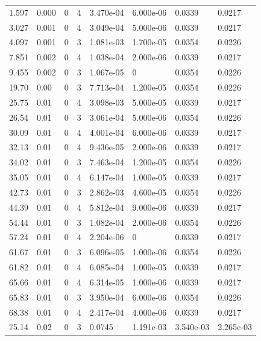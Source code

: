 \documentclass[preview]{standalone}
\begin{document}
{{\begin{tabular}{L{1.2cm}C{1.2cm} C{0.3cm}C{0.5cm} C{1.4cm}C{1.4cm} C{1.4cm}C{1.4cm}}
  1.597  &  0.000  & 0     &  4 &  3.470e-04  & 6.000e-06  & 0.0339 &  0.0217   \\ 
  3.027  &  0.001  & 0     &  4 &  3.049e-04  & 5.000e-06  & 0.0339 &  0.0217   \\ 
  4.097  &  0.001  & 0     &  3 &  1.081e-03  & 1.700e-05  & 0.0354 &  0.0226   \\ 
  7.851  &  0.002  & 0     &  4 &  1.038e-04  & 2.000e-06  & 0.0339 &  0.0217   \\ 
  9.455  &  0.002  & 0     &  3 &  1.067e-05  & 0  & 0.0354 &  0.0226   \\ 
  19.70  &  0.00  & 0     &  3 &  7.713e-04  & 1.200e-05  & 0.0354 &  0.0226   \\ 
  25.75  &  0.01  & 0     &  4 &  3.098e-03  & 5.000e-05  & 0.0339 &  0.0217   \\ 
  26.54  &  0.01  & 0     &  3 &  3.061e-04  & 5.000e-06  & 0.0354 &  0.0226   \\ 
  30.09  &  0.01  & 0     &  4 &  4.001e-04  & 6.000e-06  & 0.0339 &  0.0217   \\ 
  32.13  &  0.01  & 0     &  4 &  9.436e-05  & 2.000e-06  & 0.0339 &  0.0217   \\ 
  34.02  &  0.01  & 0     &  3 &  7.463e-04  & 1.200e-05  & 0.0354 &  0.0226   \\ 
  35.05  &  0.01  & 0     &  4 &  6.147e-04  & 1.000e-05  & 0.0339 &  0.0217   \\ 
  42.73  &  0.01  & 0     &  3 &  2.862e-03  & 4.600e-05  & 0.0354 &  0.0226   \\ 
  44.39  &  0.01  & 0     &  4 &  5.812e-04  & 9.000e-06  & 0.0339 &  0.0217   \\ 
  54.44  &  0.01  & 0     &  3 &  1.082e-04  & 2.000e-06  & 0.0354 &  0.0226   \\ 
  57.24  &  0.01  & 0     &  4 &  2.204e-06  & 0  & 0.0339 &  0.0217   \\ 
  61.67  &  0.01  & 0     &  3 &  6.096e-05  & 1.000e-06  & 0.0354 &  0.0226   \\ 
  61.82  &  0.01  & 0     &  4 &  6.085e-04  & 1.000e-05  & 0.0339 &  0.0217   \\ 
  65.66  &  0.01  & 0     &  4 &  6.314e-05  & 1.000e-06  & 0.0339 &  0.0217   \\ 
  65.83  &  0.01  & 0     &  3 &  3.950e-04  & 6.000e-06  & 0.0354 &  0.0226   \\ 
  68.38  &  0.01  & 0     &  4 &  2.417e-04  & 4.000e-06  & 0.0339 &  0.0217   \\ 
  75.14  &  0.02  & 0     &  3 &  0.0745  & 1.191e-03  & 3.540e-03 &  2.265e-03   \\ 

\end{tabular}}}
\end{document}
